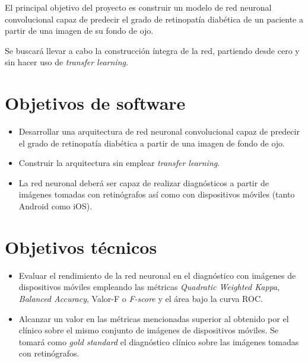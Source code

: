 
El principal objetivo del proyecto es construir un modelo de red neuronal convolucional capaz de predecir el grado de retinopatía diabética de un paciente a partir de una imagen de su fondo de ojo.

Se buscará llevar a cabo la construcción íntegra de la red, partiendo desde cero y sin hacer uso de \textit{transfer learning}.

\section{Objetivos de software}
\begin{itemize}[itemsep=0.25em]
    \item Desarrollar una arquitectura de red neuronal convolucional capaz de predecir el grado de retinopatía diabética a partir de una imagen de fondo de ojo.
    \item Construir la arquitectura sin emplear \textit{transfer learning}.
    \item La red neuronal deberá ser capaz de realizar diagnósticos a partir de imágenes tomadas con retinógrafos así como con dispositivos móviles (tanto Android como iOS).
\end{itemize}

\section{Objetivos técnicos}
\begin{itemize}[itemsep=0.25em]
    \item Evaluar el rendimiento de la red neuronal en el diagnóstico con imágenes de dispositivos móviles empleando las métricas \textit{Quadratic Weighted Kappa}, \textit{Balanced Accuracy}, Valor-F o \textit{F-score} y el área bajo la curva ROC.
    \item Alcanzar un valor en las métricas mencionadas superior al obtenido por el clínico sobre el mismo conjunto de imágenes de dispositivos móviles. Se tomará como \textit{gold standard} el diagnóstico clínico sobre las imágenes tomadas con retinógrafos.
\end{itemize}

